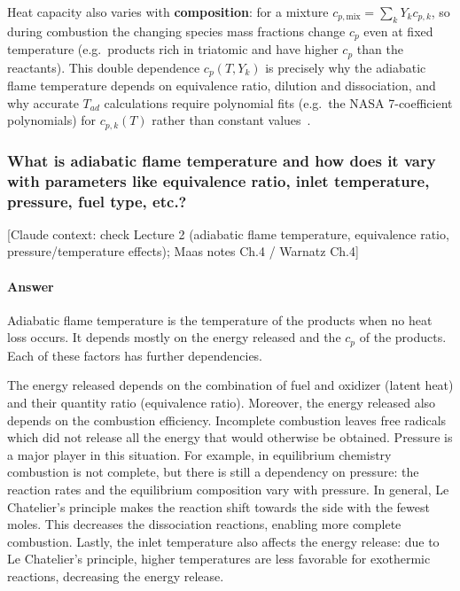 {Heat capacity also varies with \textbf{composition}: for a mixture $c_{p,\mathrm{mix}} = \sum_k Y_k c_{p,k}$, so during combustion the changing species mass fractions change $c_p$ even at fixed temperature (e.g.\ products rich in triatomic  and  have higher $c_p$ than the reactants). This double dependence $c_p(T, Y_k)$ is precisely why the adiabatic flame temperature depends on equivalence ratio, dilution and dissociation, and why accurate $T_{ad}$ calculations require polynomial fits (e.g.\ the NASA 7-coefficient polynomials) for $c_{p,k}(T)$ rather than constant values~\cite{warnatz2006combustion,glassman2014combustion}.
}


\subsubsection{What is adiabatic flame temperature and how does it vary with parameters like equivalence ratio, inlet temperature, pressure, fuel type, etc.?}

{\color{gray}\footnotesize [Claude context: check Lecture 2 (adiabatic flame temperature, equivalence ratio, pressure/temperature effects); Maas notes Ch.4 / Warnatz Ch.4]}

\paragraph{Answer}
Adiabatic flame temperature is the temperature of the products when no heat loss occurs. It depends mostly on the energy released and the $c_p$ of the products. Each of these factors has further dependencies.

The energy released depends on the combination of fuel and oxidizer (latent heat) and their quantity ratio (equivalence ratio). Moreover, the energy released also depends on the combustion efficiency. Incomplete combustion leaves free radicals which did not release all the energy that would otherwise be obtained. Pressure is a major player in this situation. For example, in equilibrium chemistry combustion is not complete, but there is still a dependency on pressure: the reaction rates and the equilibrium composition vary with pressure. In general, Le Chatelier's principle makes the reaction shift towards the side with the fewest moles. This decreases the dissociation reactions, enabling more complete combustion. Lastly, the inlet temperature also affects the energy release: due to Le Chatelier's principle, higher temperatures are less favorable for exothermic reactions, decreasing the energy release.

